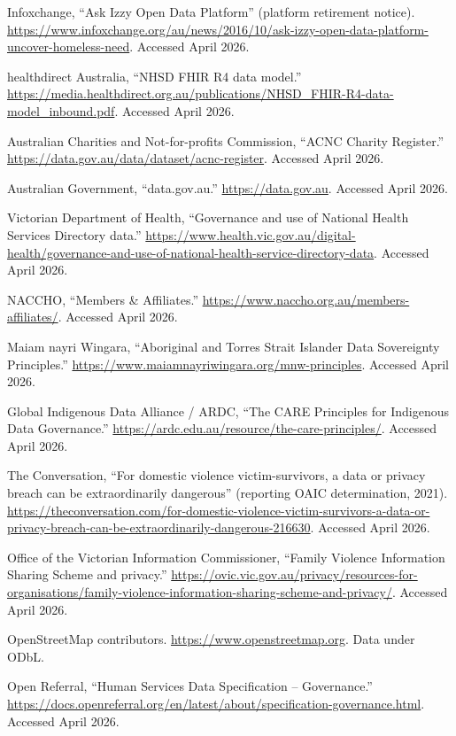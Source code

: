 \documentclass[11pt,a4paper]{article}
\begin{document}
\begin{enumerate}[nosep,label={[\arabic*]}]
    \item Infoxchange, ``Ask Izzy Open Data Platform'' (platform retirement notice). \url{https://www.infoxchange.org/au/news/2016/10/ask-izzy-open-data-platform-uncover-homeless-need}. Accessed April 2026.
    \item healthdirect Australia, ``NHSD FHIR R4 data model.'' \url{https://media.healthdirect.org.au/publications/NHSD_FHIR-R4-data-model_inbound.pdf}. Accessed April 2026.
    \item Australian Charities and Not-for-profits Commission, ``ACNC Charity Register.'' \url{https://data.gov.au/data/dataset/acnc-register}. Accessed April 2026.
    \item Australian Government, ``data.gov.au.'' \url{https://data.gov.au}. Accessed April 2026.
    \item Victorian Department of Health, ``Governance and use of National Health Services Directory data.'' \url{https://www.health.vic.gov.au/digital-health/governance-and-use-of-national-health-service-directory-data}. Accessed April 2026.
    \item NACCHO, ``Members \& Affiliates.'' \url{https://www.naccho.org.au/members-affiliates/}. Accessed April 2026.
    \item Maiam nayri Wingara, ``Aboriginal and Torres Strait Islander Data Sovereignty Principles.'' \url{https://www.maiamnayriwingara.org/mnw-principles}. Accessed April 2026.
    \item Global Indigenous Data Alliance / ARDC, ``The CARE Principles for Indigenous Data Governance.'' \url{https://ardc.edu.au/resource/the-care-principles/}. Accessed April 2026.
    \item The Conversation, ``For domestic violence victim-survivors, a data or privacy breach can be extraordinarily dangerous'' (reporting OAIC determination, 2021). \url{https://theconversation.com/for-domestic-violence-victim-survivors-a-data-or-privacy-breach-can-be-extraordinarily-dangerous-216630}. Accessed April 2026.
    \item Office of the Victorian Information Commissioner, ``Family Violence Information Sharing Scheme and privacy.'' \url{https://ovic.vic.gov.au/privacy/resources-for-organisations/family-violence-information-sharing-scheme-and-privacy/}. Accessed April 2026.
    \item OpenStreetMap contributors. \url{https://www.openstreetmap.org}. Data under ODbL.
    \item Open Referral, ``Human Services Data Specification -- Governance.'' \url{https://docs.openreferral.org/en/latest/about/specification-governance.html}. Accessed April 2026.

\end{enumerate}
\end{document}

